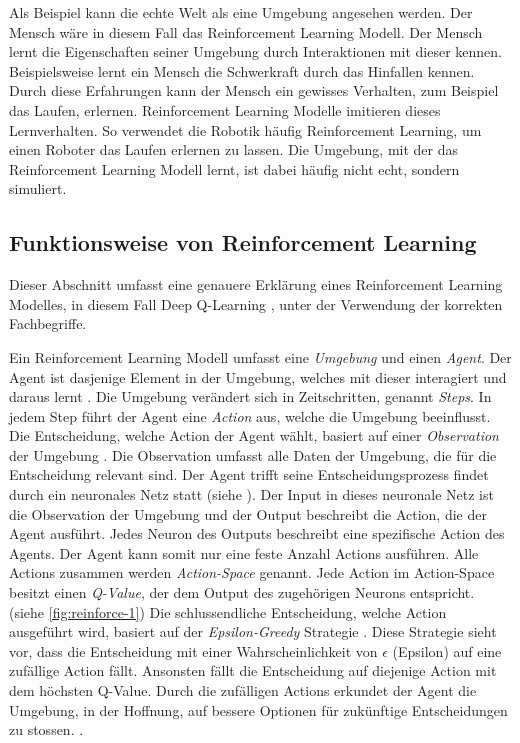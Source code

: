 Als Beispiel kann die echte Welt als eine Umgebung angesehen werden. Der Mensch
wäre in diesem Fall das Reinforcement Learning Modell. Der Mensch lernt die
Eigenschaften seiner Umgebung durch Interaktionen mit dieser kennen.
Beispielsweise lernt ein Mensch die Schwerkraft durch das Hinfallen kennen.
Durch diese Erfahrungen kann der Mensch ein gewisses Verhalten, zum Beispiel das
Laufen, erlernen. Reinforcement Learning Modelle imitieren dieses Lernverhalten.
So verwendet die Robotik häufig Reinforcement Learning, um einen Roboter das
Laufen erlernen zu lassen. Die Umgebung, mit der das Reinforcement Learning
Modell lernt, ist dabei häufig nicht echt, sondern simuliert.

\subsection{Funktionsweise von Reinforcement Learning}\label{sub:t_rl_func}
Dieser Abschnitt umfasst eine genauere Erklärung eines Reinforcement Learning
Modelles, in diesem Fall Deep Q-Learning \cite{mnih_playing_2013}, unter der
Verwendung der korrekten Fachbegriffe.

Ein Reinforcement Learning Modell umfasst eine \emph{Umgebung} und einen
\emph{Agent}. Der Agent ist dasjenige Element in der Umgebung, welches mit
dieser interagiert und daraus lernt \cite[S. 53]{sutton_reinforcement_2014}. Die
Umgebung verändert sich in Zeitschritten, genannt \emph{Steps}. In jedem Step
führt der Agent eine \emph{Action} aus, welche die Umgebung beeinflusst. Die
Entscheidung, welche Action der Agent wählt, basiert auf einer
\emph{Observation} der Umgebung \cite[S. 2]{mnih_playing_2013}. Die Observation
umfasst alle Daten der Umgebung, die für die Entscheidung relevant sind. Der
Agent trifft seine Entscheidungsprozess findet durch ein neuronales Netz statt
(siehe ). Der Input in dieses neuronale Netz ist die
Observation der Umgebung und der Output beschreibt die Action, die der Agent
ausführt. Jedes Neuron des Outputs beschreibt eine spezifische Action des
Agents. Der Agent kann somit nur eine feste Anzahl Actions ausführen. Alle
Actions zusammen werden \emph{Action-Space} \cite[S.
67]{sutton_reinforcement_2014} genannt. Jede Action im Action-Space besitzt
einen \emph{Q-Value}, der dem Output des zugehörigen Neurons entspricht. (siehe
\autoref{fig:reinforce-1}) \cite{wang_deep_2021} Die schlussendliche
Entscheidung, welche Action ausgeführt wird, basiert auf der
\emph{Epsilon-Greedy} Strategie \cite[S. 34]{sutton_reinforcement_2014}. Diese
Strategie sieht vor, dass die Entscheidung mit einer Wahrscheinlichkeit von
$\epsilon$ (Epsilon) auf eine zufällige Action fällt. Ansonsten fällt die
Entscheidung auf diejenige Action mit dem höchsten Q-Value. Durch die zufälligen
Actions erkundet der Agent die Umgebung, in der Hoffnung, auf bessere Optionen
für zukünftige Entscheidungen zu stossen.
\cite{rajendra_koppula_exploration_nodate}.

